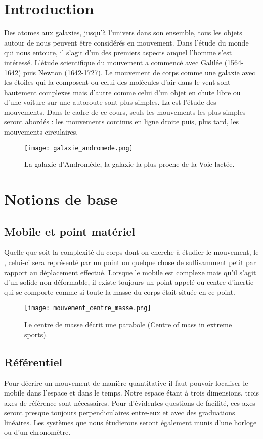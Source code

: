 \chapter{Introduction}
Des atomes aux galaxies, jusqu'à l'univers dans son ensemble, tous les objets autour de nous peuvent être considérés en mouvement. Dans l'étude du monde qui nous entoure, il s'agit d'un des premiers aspects auquel l'homme s'est intéressé. L'étude scientifique du mouvement a commencé avec Galilée (1564-1642) puis Newton (1642-1727). Le mouvement de corps comme une galaxie avec les étoiles qui la composent ou celui des molécules d'air dans le vent sont hautement complexes mais d'autre comme celui d'un objet en chute libre ou d'une voiture sur une autoroute sont plus simples.
La  est l'étude des mouvements. Dans le cadre de ce cours, seuls les mouvements les plus simples seront abordés : les mouvements continus en ligne droite puis, plus tard, les mouvements circulaires.
\begin{figure}[h!]
    \centering
    \texttt{[image: galaxie\_andromede.png]}
    \caption{La galaxie d'Andromède, la galaxie la plus proche de la Voie lactée. }
    \label{galaxie_andromede}
\end{figure}


\chapter{Notions de base}
\section{Mobile et point matériel}
Quelle que soit la complexité du corps dont on cherche à étudier le mouvement, le , celui-ci sera représenté par un point ou quelque chose de suffisamment petit par rapport au déplacement effectué. Lorsque le mobile est complexe mais qu'il s'agit d'un solide non déformable, il existe toujours un point appelé  ou centre d'inertie qui se comporte comme si toute la masse du corps était située en ce point.
\begin{figure}[h!]
    \centering
    \texttt{[image: mouvement\_centre\_masse.png]}
    \caption{Le centre de masse décrit une parabole (Centre of mass in extreme sports). }
    \label{mouvement_centre_masse}
\end{figure}

\newpage

\section{Référentiel}
Pour décrire un mouvement de manière quantitative il faut pouvoir localiser le mobile dans l'espace et dans le temps. Notre espace étant à trois dimensions, trois axes de référence sont nécessaires. Pour d'évidentes questions de facilité, ces axes seront presque toujours perpendiculaires entre-eux et avec des graduations linéaires. Les systèmes que nous étudierons seront également munis d'une horloge ou d'un chronomètre.

